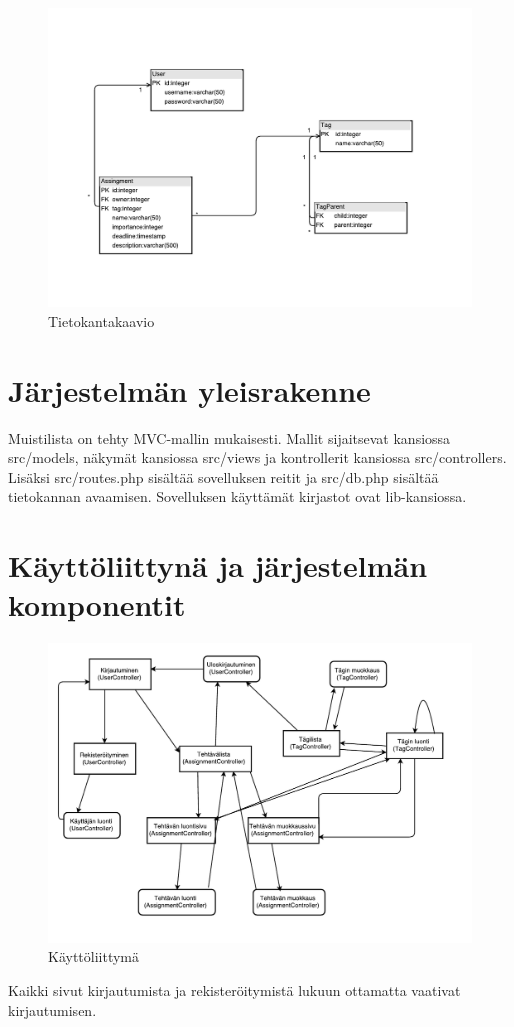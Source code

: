 \documentclass[a4paper, 12pt, finnish]{article}
\begin{document}
\begin{figure}[h]
  \caption{Tietokantakaavio}
  \centering
  \includegraphics[scale=0.7]{tietokantakaavio}
\end{figure}

\section{Järjestelmän yleisrakenne}
Muistilista on tehty MVC-mallin mukaisesti. Mallit sijaitsevat kansiossa src/models,
näkymät kansiossa src/views ja kontrollerit kansiossa src/controllers. Lisäksi src/routes.php
sisältää sovelluksen reitit ja src/db.php sisältää tietokannan avaamisen. Sovelluksen käyttämät
kirjastot ovat lib-kansiossa.

\section{Käyttöliittynä ja järjestelmän komponentit}

\begin{figure}[h]
  \caption{Käyttöliittymä}
  \centering
  \includegraphics[scale=0.6]{kayttoliittyma}
\end{figure}
Kaikki sivut kirjautumista ja rekisteröitymistä lukuun ottamatta vaativat kirjautumisen.
\end{document}
